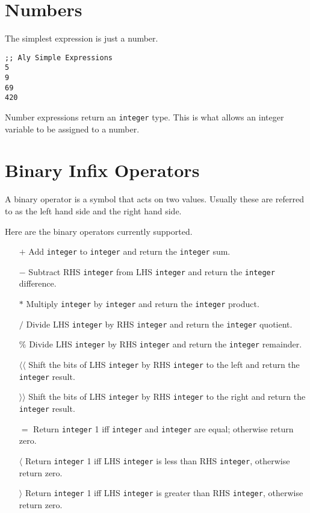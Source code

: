 \documentclass[12pt]{report}
\begin{document}
\section{Numbers}
\label{subsec:expressions-numbers}

The simplest expression is just a number.
\begin{Verbatim}[samepage=true]
;; Aly Simple Expressions
5
9
69
420
\end{Verbatim}

Number expressions return an \verb|integer| type. This is what allows an integer variable to be assigned to a number.

\section{Binary Infix Operators}
\label{subsec:expressions-binops}

A binary operator is a symbol that acts on two values. Usually these are referred to as the left hand side and the right hand side.

Here are the binary operators currently supported.

\begin{itemize}

\item[$+$]
  Add \verb|integer| to \verb|integer| and return the \verb|integer| sum.
\item[$-$]
  Subtract RHS \verb|integer| from LHS \verb|integer| and return the \verb|integer| difference.
\item[$*$]
  Multiply \verb|integer| by \verb|integer| and return the \verb|integer| product.
\item[$/$]
 Divide LHS \verb|integer| by RHS \verb|integer| and return the \verb|integer| quotient.
\item[$\%$]
 Divide LHS \verb|integer| by RHS \verb|integer| and return the \verb|integer| remainder.

\item[$\langle\langle$]
 Shift the bits of LHS \verb|integer| by RHS \verb|integer| to the left and return the \verb|integer| result.
\item[$\rangle\rangle$]
 Shift the bits of LHS \verb|integer| by RHS \verb|integer| to the right and return the \verb|integer| result.

\item[$=$]
 Return \verb|integer| 1 iff \verb|integer| and \verb|integer| are equal; otherwise return zero.
\item[$\langle$]
 Return \verb|integer| 1 iff LHS \verb|integer| is less than RHS \verb|integer|, otherwise return zero.
\item[$\rangle$]
 Return \verb|integer| 1 iff LHS \verb|integer| is greater than RHS \verb|integer|, otherwise return zero.
\end{itemize}
\end{document}
